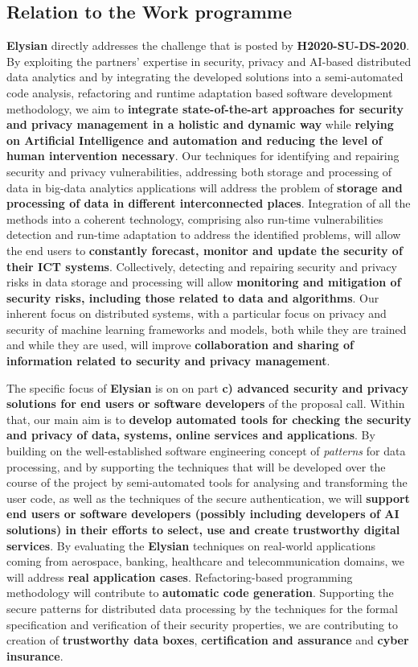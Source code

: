 \documentclass[a4paper,11pt]{article}
\newcommand{\project}[1]{\textbf{#1}\xspace}
\newcommand{\SECURITY}{\project{Elysian}}
\newcommand{\TheProject}{\SECURITY}
\begin{document}
\subsection{Relation to the Work programme}

\TheProject{} directly addresses the challenge that is posted by \textbf{H2020-SU-DS-2020}. By exploiting the partners' expertise in security, privacy and AI-based distributed data analytics and by integrating the developed solutions into a semi-automated code analysis, refactoring and runtime adaptation based software development methodology, we aim to \textbf{integrate state-of-the-art approaches for security and privacy management in a holistic and dynamic way} while \textbf{relying on Artificial Intelligence and automation and reducing the level of human intervention necessary}. Our techniques for identifying and repairing security and privacy vulnerabilities, addressing both storage and processing of data in big-data analytics applications will address the problem of \textbf{storage and processing of data in different interconnected places}. Integration of all the methods into a coherent technology, comprising also run-time vulnerabilities detection and run-time adaptation to address the identified problems, will allow the end users to  \textbf{constantly forecast, monitor and update the security of their ICT systems}. Collectively, detecting and repairing security and privacy risks in data storage and processing will allow \textbf{monitoring and mitigation of security risks, including those related to data and algorithms}. Our inherent focus on distributed systems, with a particular focus on privacy and security of machine learning frameworks and models, both while they are trained and while they are used, will improve \textbf{collaboration and sharing of information related to security and privacy management}. 


The specific focus of \TheProject{} is on on part \textbf{c) advanced security and privacy solutions for end users or software developers} of the proposal call. Within that, our main aim is to \textbf{develop automated tools for checking the security and privacy of data, systems, online services and applications}. By building on the well-established software engineering concept of \emph{patterns} for data processing, and by supporting the techniques that will be developed over the course of the project by semi-automated tools for analysing and transforming the user code, as well as the techniques of the secure authentication, we will \textbf{support end users or software developers (possibly including developers of AI solutions) in their efforts to select, use and create trustworthy digital services}. By evaluating the \TheProject{} techniques on real-world applications coming from aerospace, banking, healthcare and telecommunication domains, we will address \textbf{real application cases}. Refactoring-based programming methodology will contribute to \textbf{automatic code generation}. Supporting the secure patterns for distributed data processing by the techniques for the formal specification and verification of their security properties, we are contributing to creation of \textbf{trustworthy data boxes}, \textbf{certification and assurance} and \textbf{cyber insurance}.
\end{document}
